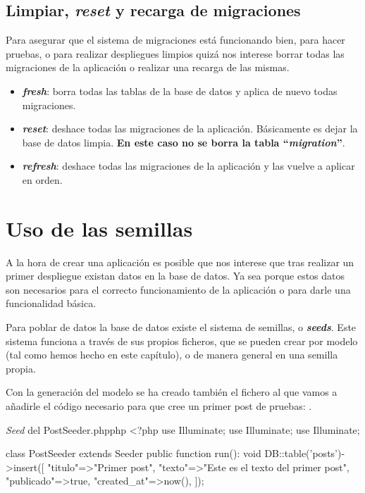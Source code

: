 \subsection{Limpiar, \textit{reset} y recarga de migraciones}

Para asegurar que el sistema de migraciones está funcionando bien, para hacer pruebas, o para realizar despliegues limpios quizá nos interese borrar todas las migraciones de la aplicación o realizar una recarga de las mismas.

\begin{itemize}
    \item \textbf{\textit{fresh}}: borra todas las tablas de la base de datos y aplica de nuevo todas migraciones.
    \item \textbf{\textit{reset}}: deshace todas las migraciones de la aplicación. Básicamente es dejar la base de datos limpia. \textbf{En este caso no se borra la tabla “\textit{migration}”}.
    \item \textbf{\textit{refresh}}: deshace todas las migraciones de la aplicación y las vuelve a aplicar en orden.
\end{itemize}


\section{Uso de las semillas}

A la hora de crear una aplicación es posible que nos interese que tras realizar un primer despliegue existan datos en la base de datos. Ya sea porque estos datos son necesarios para el correcto funcionamiento de la aplicación o para darle una funcionalidad básica.

Para poblar de datos la base de datos existe el sistema de semillas, o \textbf{\textit{seeds}}. Este sistema funciona a través de sus propios ficheros, que se pueden crear por modelo (tal como hemos hecho en este capítulo), o de manera general en una semilla propia.

Con la generación del modelo se ha creado también el fichero  al que vamos a añadirle el código necesario para que cree un primer post de pruebas: .

\begin{mycode}{\textit{Seed} del PostSeeder.php}{php}{}
<?php
use Illuminate\Database\Console\Seeds\WithoutModelEvents;
use Illuminate\Database\Seeder;
use Illuminate\Support\Facades\DB;

class PostSeeder extends Seeder {
    public function run(): void {
        DB::table('posts')->insert([
            "titulo"=>"Primer post",
            "texto"=>"Este es el texto del primer post",
            "publicado"=>true,
            "created_at"=>now(),
        ]);
    }
}
\end{mycode}

